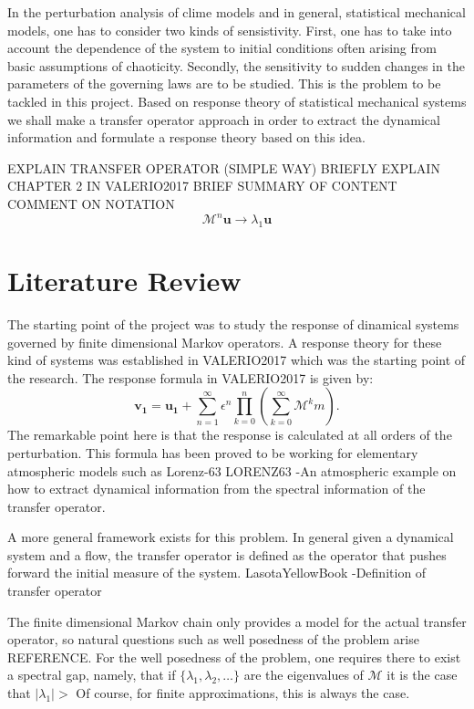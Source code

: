 
\noindent In the perturbation analysis of clime models and in general, statistical mechanical models, one has to consider two kinds of sensistivity. First, one has to take into account the dependence of the system to initial conditions often arising from basic assumptions of chaoticity. Secondly, the sensitivity to sudden changes in the parameters of the governing laws are to be studied. This is the problem to be tackled in this project. Based on response theory of statistical mechanical systems we shall make a transfer operator approach in order to extract the dynamical information and formulate a response theory based on this idea.

EXPLAIN TRANSFER OPERATOR (SIMPLE WAY)
BRIEFLY EXPLAIN CHAPTER 2 IN VALERIO2017
BRIEF SUMMARY OF CONTENT
COMMENT ON NOTATION
\begin{equation}\label{powermethod}
	\mathcal{M}^n\mathbf{u} \longrightarrow \lambda _1\mathbf{u}
\end{equation}

\section*{Literature Review}
The starting point of the project was to study the response of dinamical systems governed by finite dimensional Markov operators. A response theory for these kind of systems was established in VALERIO2017 which was the starting point of the research. The response formula in VALERIO2017 is given by:
\begin{equation}
\mathbf{v_1}=\mathbf{u_1} + \sum_{n=1}^{\infty}\epsilon ^{n} \prod _{k=0}^{n}\left( \sum_{k=0}^{\infty}\mathcal{M}^km \right).
\end{equation}
The remarkable point here is that the response is calculated at all orders of the perturbation. This formula has been proved to be working for elementary atmospheric models such as Lorenz-63 LORENZ63
-An atmospheric example on how to extract dynamical information from the spectral information of the transfer operator.

A more general framework exists for this problem. In general given a dynamical system and a flow, the transfer operator is defined as the operator that pushes forward the initial measure of the system.
LasotaYellowBook
	-Definition of transfer operator

The finite dimensional Markov chain only provides a model for the actual transfer operator, so natural questions such as well posedness of the problem arise REFERENCE. For the well posedness of the problem, one requires there to exist a spectral gap, namely, that if $\{\lambda_1 , \lambda_2 , \ldots \}$ are the eigenvalues of $\mathcal{M}$ it is the case that $\vert \lambda _1 \vert >  $
Of course, for finite approximations, this is always the case.

